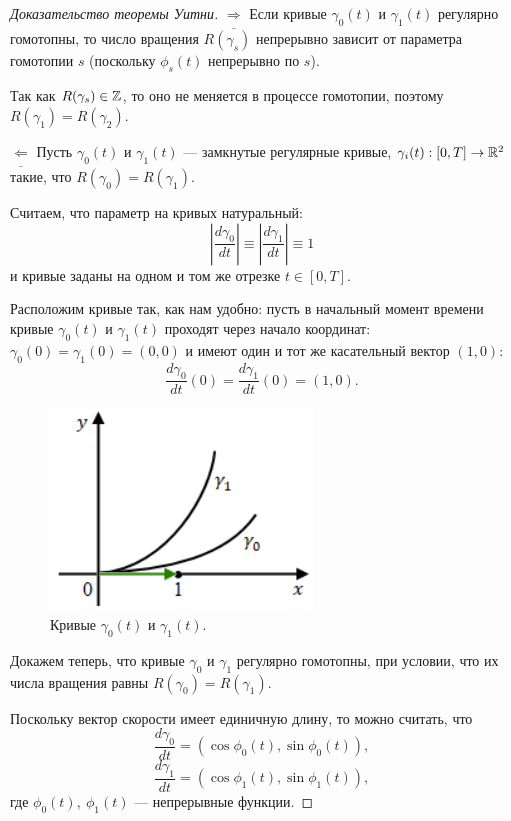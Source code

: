 \begin{proof}[Доказательство теоремы Уитни]
    $\underline{\Longrightarrow}$ 
    Если кривые $\gamma_0(t)$ и $\gamma_1(t)$ регулярно гомотопны, то число вращения $R(\gamma_s)$ непрерывно зависит от параметра гомотопии $s$ (поскольку $\phi_s(t)$ непрерывно по $s$).

    Так как $R(\gamma_s) \in \mathbb{Z}$, то оно не меняется в процессе гомотопии, поэтому $R(\gamma_1) = R(\gamma_2)$.

    $\underline{\Longleftarrow}$ 
    Пусть $\gamma_0(t)$ и $\gamma_1(t)$ — замкнутые регулярные кривые, $\gamma_i(t): [0,T] \to \mathbb{R}^2$ такие, что $R(\gamma_0) = R(\gamma_1)$.

    Считаем, что параметр на кривых натуральный:
    \[\left|\frac{d\gamma_0}{dt}\right| \equiv \left|\frac{d\gamma_1}{dt}\right| \equiv 1\]
    и кривые заданы на одном и том же отрезке $t \in [0,T]$.

    Расположим кривые так, как нам удобно: пусть в начальный момент времени кривые $\gamma_0(t)$ и $\gamma_1(t)$ проходят через начало координат: $\gamma_0(0) = \gamma_1(0) = (0,0)$ и имеют один и тот же касательный вектор $(1,0)$:
    \[\frac{d\gamma_0}{dt}(0) = \frac{d\gamma_1}{dt}(0) = (1,0).\]

    \begin{figure}[ht]
        \centering
        \includegraphics[scale=0.7]{images/c13.1.png}
        \caption{Кривые $\gamma_0(t)$ и $\gamma_1(t)$.}
        \label{fig:c13.1}
    \end{figure}

    Докажем теперь, что кривые $\gamma_0$ и $\gamma_1$ регулярно гомотопны, при условии, что их числа вращения равны $R(\gamma_0) = R(\gamma_1)$.

    Поскольку вектор скорости имеет единичную длину, то можно считать, что
    \[\frac{d\gamma_0}{dt} = (\cos{\phi_0(t)}, \sin{\phi_0(t)}),\]
    \[\frac{d\gamma_1}{dt} = (\cos{\phi_1(t)}, \sin{\phi_1(t)}),\]
    где $\phi_0(t), \ \phi_1(t)$ — непрерывные функции.


\end{proof}
